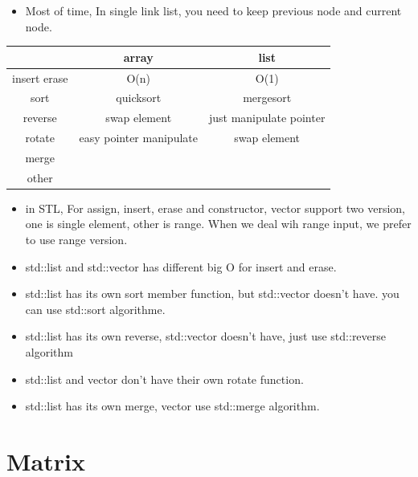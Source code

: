 \documentclass[a4paper,11pt,twoside]{book}
\begin{document}
\begin{itemize}
\begin{itemize}
\item Most of time, In single link list, you need to keep previous node and current node. 
\end{itemize}

\begin{tabular}{|c|c|c|}
\hline 
 & array & list \\ 
\hline 
insert erase & O(n) & O(1) \\ 
\hline 
sort & quicksort & mergesort  \\ 
\hline 
reverse & swap element & just manipulate pointer  \\ 
\hline 
rotate & easy pointer manipulate & swap element  \\ 
\hline 
merge &  &  \\ 
\hline 
other  &  &  \\ 
\hline 

\end{tabular} 

\begin{itemize}
	
\item in STL,  For assign, insert, erase and constructor, vector support two version, one is single element, other is range.  When we deal wih range input, we prefer to use range version. 

\item std::list and std::vector has different big O for insert and erase.

\item std::list has its own sort member function, but std::vector doesn't have. you can use std::sort algorithme. 

\item std::list has its own reverse,  std::vector doesn't have, just use std::reverse algorithm

\item std::list and vector don't have their own rotate function.

\item std::list has its own merge, vector use std::merge algorithm.

\end{itemize}

\end{itemize}

\section{Matrix}
\end{document}
